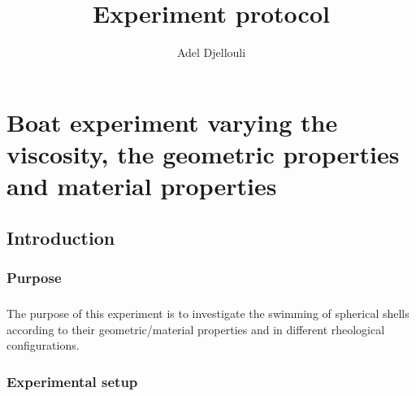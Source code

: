 \documentclass[a4paper,twoside,10pt]{report}
\begin{document}
\pagestyle{empty} %



\title{Experiment protocol}
\author{Adel Djellouli}
\maketitle



\tableofcontents %
\cleardoublepage %

\pagestyle{plain} %







\chapter{Boat experiment varying the viscosity, the geometric properties and material properties}

\section{Introduction}
\subsection{Purpose}
\paragraph{}
The purpose of this experiment is to investigate the swimming of spherical shells according to their geometric/material properties and in different rheological configurations.
\subsection{Experimental setup}
\end{document}
